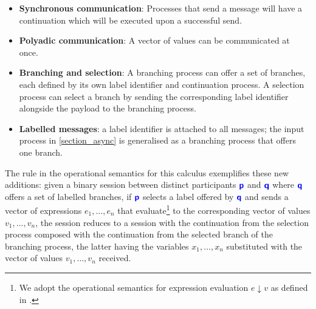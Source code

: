 \begin{itemize}
\item \textbf{Synchronous communication}: Processes that send a message will have a continuation which will be executed upon a successful send. 
\item \textbf{Polyadic communication}: A vector of values can be communicated at once.
\item \textbf{Branching and selection}: A branching process can offer a set of branches, each defined by its own label identifier and continuation process. A selection process can select a branch by sending the corresponding label identifier alongside the payload to the branching process.

\item \textbf{Labelled messages}: a label identifier is attached to all messages; the input process in {\ref{section_async}} is generalised as a branching process that offers one branch.
\end{itemize}

The  rule in the operational semantics for this calculus exemplifies these new additions: given a binary session between distinct participants ${\color{blue}\bm{\mathsf{p}}}$ and ${\color{blue}\bm{\mathsf{q}}}$ where ${\color{blue}\bm{\mathsf{q}}}$ offers a set of labelled branches, if ${\color{blue}\bm{\mathsf{p}}}$ selects a label offered by ${\color{blue}\bm{\mathsf{q}}}$ and sends a vector of expressions $e_1, \dots, e_n$ that evaluate\footnote{We adopt the operational semantics for expression evaluation $e \downarrow v$ as defined in \cite{C406Lecture}.} to the corresponding vector of values $v_1, \dots, v_n$, the session reduces to a session with the continuation from the selection process composed with the continuation from the selected branch of the branching process, the latter having the variables $x_1, \dots, x_n$ substituted with the vector of values $v_1, \dots, v_n$ received.


